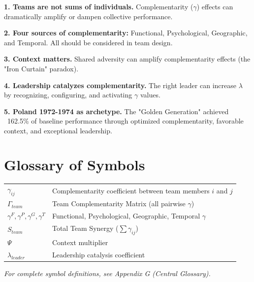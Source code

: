 \begin{tcolorbox}[colback=gray!10!white, colframe=gray!75!black, title=Key Takeaways: Team Complementarity]

\textbf{1. Teams are not sums of individuals.} Complementarity ($\gamma$) effects
can dramatically amplify or dampen collective performance.

\textbf{2. Four sources of complementarity:} Functional, Psychological,
Geographic, and Temporal. All should be considered in team design.

\textbf{3. Context matters.} Shared adversity can amplify complementarity
effects (the "Iron Curtain" paradox).

\textbf{4. Leadership catalyzes complementarity.} The right leader can
increase $\lambda$ by recognizing, configuring, and activating $\gamma$ values.

\textbf{5. Poland 1972-1974 as archetype.} The "Golden Generation" achieved
~162.5\% of baseline performance through optimized complementarity, favorable
context, and exceptional leadership.

\end{tcolorbox}



\section*{Glossary of Symbols}

\begin{tabular}{ll}
$\gamma_{ij}$ & Complementarity coefficient between team members $i$ and $j$ \\
$\Gamma_{team}$ & Team Complementarity Matrix (all pairwise $\gamma$) \\
$\gamma^{F}, \gamma^{P}, \gamma^{G}, \gamma^{T}$ & Functional, Psychological, Geographic, Temporal $\gamma$ \\
$S_{team}$ & Total Team Synergy ($\sum \gamma_{ij}$) \\
$\Psi$ & Context multiplier \\
$\lambda_{leader}$ & Leadership catalysis coefficient \\
\end{tabular}

\vspace{1em}
\textit{For complete symbol definitions, see Appendix G (Central Glossary).}


